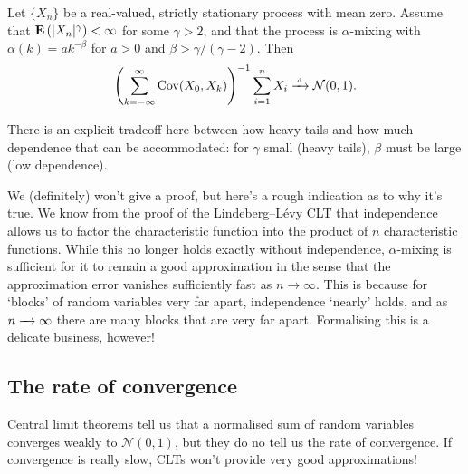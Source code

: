 \documentclass[11pt,letterpaper,reqno,oneside]{article}
\begin{document}
\begin{theorem}
	Let $\{ X_n \}$ be a real-valued, strictly stationary process with mean zero. Assume that $\mathbf{E}\left( \lvert X_n\rvert^\gamma \right) < \infty$ for some $\gamma>2$, and that the process is $\alpha$-mixing with $\alpha(k) = a k^{-\beta}$ for $a>0$ and $\beta > \gamma/(\gamma-2)$. Then 
	\begin{equation*}
		\left( \sum_{k=-\infty}^\infty \mathrm{Cov}(X_0,X_k) \right)^{-1}
		\sum_{i=1}^n X_i
		\xrightarrow{{\scriptscriptstyle \mathrm{\;d\;}}} \mathcal{N}(0,1) .
	\end{equation*}
\end{theorem}

\begin{remark}
	There is an explicit tradeoff here between how heavy tails and how much dependence that can be accommodated: for $\gamma$ small (heavy tails), $\beta$ must be large (low dependence).
\end{remark}

We (definitely) won't give a proof, but here's a rough indication as to why it's true. We know from the proof of the Lindeberg--Lévy CLT that independence allows us to factor the characteristic function into the product of $n$ characteristic functions. While this no longer holds exactly without independence, $\alpha$-mixing is sufficient for it to remain a good approximation in the sense that the approximation error vanishes sufficiently fast as $n\to\infty$. This is because for `blocks' of random variables very far apart, independence `nearly' holds, and as $n\xrightarrow{\;\;\;}\infty$ there are many blocks that are very far apart. Formalising this is a delicate business, however!



\subsection{The rate of convergence}
\label{sec:CLTs:Berry--Esseen}

Central limit theorems tell us that a normalised sum of random variables converges weakly to $\mathcal{N}(0,1)$, but they do no tell us the rate of convergence. If convergence is really slow, CLTs won't provide very good approximations!
\end{document}
